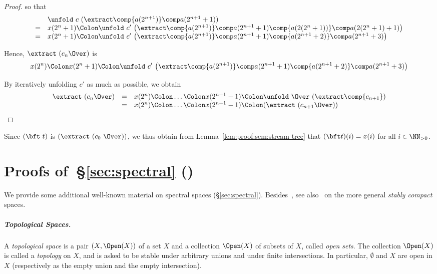 \begin{proof}
\noindent
so that
\[
\begin{array}{l l}
& \unfold\ c\ ({\extract} \comp {a(2^{n+1})} \comp a(2^{n+1}+1))
\\
%
  =
& x(2^n+1) \Colon
  \unfold\ c'\
  \big(
  {\extract} \comp {a(2^{n+1})} \comp a(2^{n+1}+1)
   \comp {a(2(2^n+1))} \comp a(2(2^n+1)+1)
  \big)
\\
%
  =
& x(2^n+1) \Colon
  \unfold\ c'\
  \big(
  {\extract} \comp {a(2^{n+1})} \comp a(2^{n+1}+1)
   \comp {a(2^{n+1}+2)} \comp a(2^{n+1}+3)
  \big)
\end{array}
\]

\noindent
Hence,
$\extract\ (c_n \Over)$ is
\[
  x(2^n) \Colon
  x(2^n+1) \Colon
  \unfold\ c'\
  \big(
  {\extract} \comp {a(2^{n+1})} \comp a(2^{n+1}+1)
   \comp {a(2^{n+1}+2)} \comp a(2^{n+1}+3)
  \big)
\]

\noindent
By iteratively unfolding $c'$ as much as possible,
we obtain
\[
\begin{array}{r c l}
  \extract\ (c_n \Over)
& =
& x(2^n) \Colon \ldots \Colon x(2^{n+1}-1) \Colon
  \unfold\ \Over\ ({\extract} \comp {c_{n+1}})
\\
%
& =
& x(2^n) \Colon \ldots \Colon x(2^{n+1}-1) \Colon
  (\extract\ (c_{n+1} \Over))
\end{array}
\]
\end{proof}


Since $(\bft\ t)$ is $(\extract\ (c_0\ \Over))$,
we thus obtain from Lemma~\ref{lem:proof:sem:stream-tree}
that $(\bft t)(i) = x(i)$ for all $i \in \NN_{>0}$.



\section{Proofs of~\S\ref{sec:spectral} ()}
\label{sec:proof:spectral}

We provide some additional
well-known material on spectral spaces (\S\ref{sec:spectral}).
Besides~\cite{dst19book,gg24book,goubault13book},
see also~\cite{lawson11mscs} on the more general \emph{stably compact} spaces.


\subparagraph*{Topological Spaces.}
A \emph{topological space} is a pair $(X,\Open(X))$ of a set $X$
and a collection $\Open(X)$ of subsets of $X$, called \emph{open sets}.
The collection $\Open(X)$
is called a \emph{topology} on $X$,
and is asked to be stable under arbitrary unions and under finite intersections.
In particular, $\emptyset$ and $X$ are open in $X$
(respectively as the empty union and the empty intersection).

